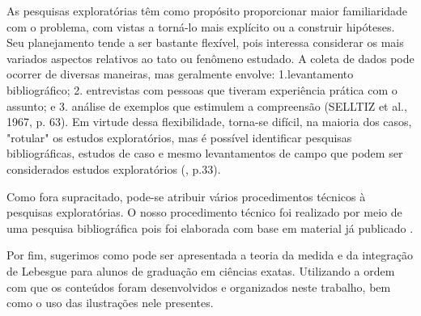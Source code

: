   	\begin{citlon}
  		As pesquisas exploratórias têm como propósito proporcionar maior familiaridade com o problema, com vistas a torná-lo mais explícito ou a construir hipóteses. 
  		Seu planejamento tende a ser bastante flexível, pois interessa considerar os mais variados aspectos relativos ao tato ou fenômeno estudado.
  		A coleta de dados pode ocorrer de diversas maneiras, mas geralmente envolve: 1.levantamento bibliográfico;
  		2. entrevistas com pessoas que tiveram experiência prática com o assunto; 
  		e 3. análise de exemplos que estimulem a compreensão (SELLTIZ et al., 1967, p. 63). 
  		Em virtude dessa flexibilidade, torna-se difícil, na maioria dos casos, "rotular" os estudos exploratórios, mas é possível identificar pesquisas bibliográficas, estudos de caso e mesmo levantamentos de campo que podem ser considerados estudos exploratórios (\citeyear{gil}, p.33).
  	\end{citlon}
  	
  	Como fora supracitado, pode-se atribuir vários procedimentos técnicos à pesquisas exploratórias. 
  	O nosso procedimento técnico foi realizado por meio de uma pesquisa bibliográfica pois foi elaborada com base em material já publicado \cite{gil}.
  	
  	Por fim, sugerimos como pode ser apresentada a teoria da medida e da integração de Lebesgue para alunos de graduação em ciências exatas.
  	Utilizando a ordem com que os conteúdos foram desenvolvidos e organizados neste trabalho, bem como o uso das ilustrações nele presentes.
    
    
    
    
    
    
    
    
    
    
    
    
    
    
    
    
    
    